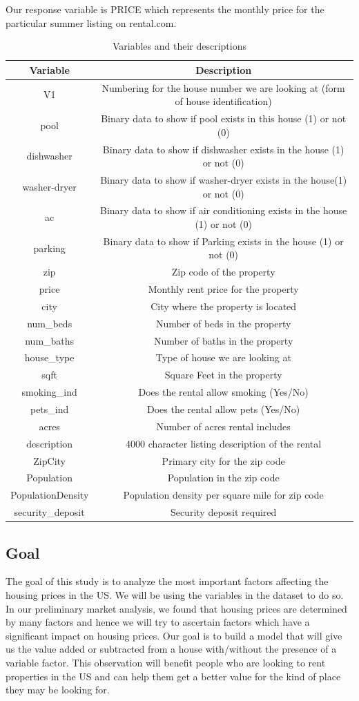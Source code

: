 \documentclass[
]{article}
\begin{document}
Our response variable is PRICE which represents the monthly price for
the particular summer listing on rental.com.

\begin{table}[!h]
\centering
\caption{Variables and their descriptions}
\begin{tabular}{cc}
\hline 
Variable & Description\tabularnewline
\hline 
V1 & Numbering for the house number we are looking at (form of house identification)\tabularnewline
pool & Binary data to show if pool exists in this house (1) or not (0)\tabularnewline
dishwasher & Binary data to show if dishwasher exists in the house (1) or not (0)\tabularnewline
washer-dryer & Binary data to show if washer-dryer exists in the house(1) or not (0)\tabularnewline
ac & Binary data to show if air conditioning exists in the house (1) or not (0)\tabularnewline
parking & Binary data to show if Parking exists in the house (1) or not (0)\tabularnewline
zip & Zip code of the property\tabularnewline
price & Monthly rent price for the property\tabularnewline
city & City where the property is located\tabularnewline
num\_beds & Number of beds in the property\tabularnewline
num\_baths & Number of baths in the property\tabularnewline
house\_type & Type of house we are looking at\tabularnewline
sqft & Square Feet in the property\tabularnewline
smoking\_ind & Does the rental allow smoking (Yes/No) \tabularnewline
pets\_ind & Does the rental allow pets (Yes/No)\tabularnewline
acres & Number of acres rental includes\tabularnewline
description & 4000 character listing description of the rental\tabularnewline
ZipCity & Primary city for the zip code\tabularnewline
Population & Population in the zip code\tabularnewline
PopulationDensity & Population density per square mile for zip code\tabularnewline
security\_deposit & Security deposit required\tabularnewline
\hline 
\end{tabular}
\label{lyxtab2}
\end{table}

\hypertarget{goal}{%
\subsection{Goal}\label{goal}}

The goal of this study is to analyze the most important factors
affecting the housing prices in the US. We will be using the variables
in the dataset to do so. In our preliminary market analysis, we found
that housing prices are determined by many factors and hence we will try
to ascertain factors which have a significant impact on housing prices.
Our goal is to build a model that will give us the value added or
subtracted from a house with/without the presence of a variable factor.
This observation will benefit people who are looking to rent properties
in the US and can help them get a better value for the kind of place
they may be looking for.
\end{document}
